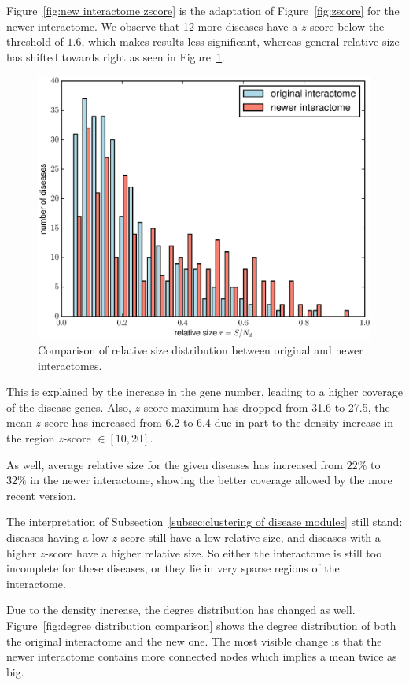 \documentclass[letterpaper]{article}
\begin{document}
	Figure~\ref{fig:new interactome zscore} is the adaptation of Figure~\ref{fig:zscore} for the newer interactome.
	We observe that 12 more diseases have a $z$-score below the threshold of $1.6$, which makes results less significant,
	whereas general relative size has shifted towards right as seen in Figure~\ref{fig:rel sizes comparison}.

	\begin{figure}[!h]
		\includegraphics[width=.5\textwidth]{images/rel_sizes_comparison.eps}
		\caption{Comparison of relative size distribution between original and newer interactomes.\label{fig:rel sizes comparison}}
	\end{figure}

	This is explained by the increase in the gene number, leading to a higher coverage of the disease genes. Also, $z$-score
	maximum has dropped from 31.6 to 27.5, the mean $z$-score has increased from 6.2 to 6.4 due in part to the density
	increase in the region $z$-score $\in [10, 20]$.

	As well, average relative size for the given diseases has increased from $22\%$ to $32\%$ in the newer interactome,
	showing the better coverage allowed by the more recent version.

	The interpretation of Subsection~\ref{subsec:clustering of disease modules} still stand: diseases having a low $z$-score still
	have a low relative size, and diseases with a higher $z$-score have a higher relative size. So either the interactome is still
	too incomplete for these diseases, or they lie in very sparse regions of the interactome.

	Due to the density increase, the degree distribution has changed as well. Figure~\ref{fig:degree distribution comparison}
	shows the degree distribution of both the original interactome and the new one. The most visible change is that the newer
	interactome contains more connected nodes which implies a mean twice as big.
\end{document}
